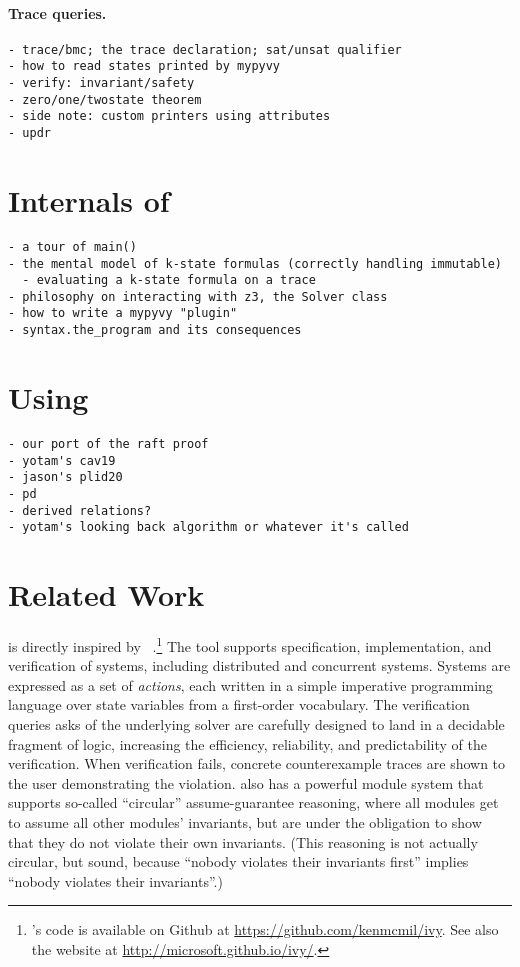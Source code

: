 \paragraph{Trace queries.}

\begin{verbatim}
- trace/bmc; the trace declaration; sat/unsat qualifier
- how to read states printed by mypyvy
- verify: invariant/safety
- zero/one/twostate theorem
- side note: custom printers using attributes
- updr
\end{verbatim}

\section{Internals of \mypyvy}

\begin{verbatim}
- a tour of main()
- the mental model of k-state formulas (correctly handling immutable)
  - evaluating a k-state formula on a trace
- philosophy on interacting with z3, the Solver class
- how to write a mypyvy "plugin"
- syntax.the_program and its consequences
\end{verbatim}

\section{Using \mypyvy}

\begin{verbatim}
- our port of the raft proof
- yotam's cav19
- jason's plid20
- pd
- derived relations?
- yotam's looking back algorithm or whatever it's called
\end{verbatim}

\section{Related Work}


\mypyvy is directly inspired by \ivy~\cite{Padon-al:PLDI16}.\footnote{
  \ivy's code is available on Github at \url{https://github.com/kenmcmil/ivy}.
  See also the \ivy website at \url{http://microsoft.github.io/ivy/}.
}
%
The \ivy tool supports specification, implementation, and verification of systems,
including distributed and concurrent systems.
%
Systems are expressed as a set of \emph{actions},
each written in a simple imperative programming language
over state variables from a first-order vocabulary.
%
The verification queries \ivy asks of the underlying solver
are carefully designed to land in a decidable fragment of logic,
increasing the efficiency, reliability, and predictability
of the verification.
%
When verification fails, concrete counterexample traces
are shown to the user demonstrating the violation.
%
\ivy{} also has a powerful module system
that supports so-called ``circular'' assume-guarantee reasoning,
where all modules get to assume all other modules' invariants,
but are under the obligation to show that they do not violate
their own invariants.
%
(This reasoning is not actually circular, but sound,
because ``nobody violates their invariants first''
implies ``nobody violates their invariants''.)

